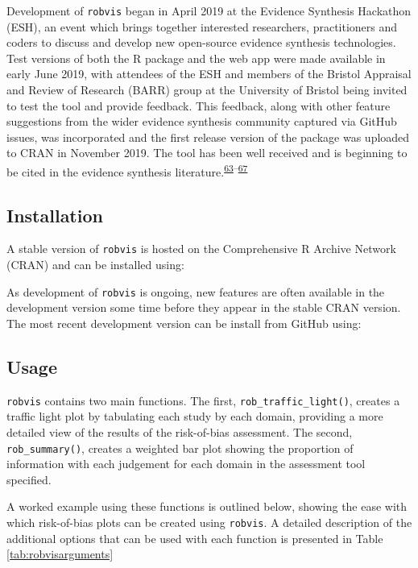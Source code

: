 \documentclass[a4paper, twoside]{templates/ociamthesis}
\begin{document}
Development of \texttt{robvis} began in April 2019 at the Evidence Synthesis Hackathon (ESH), an event which brings together interested researchers, practitioners and coders to discuss and develop new open-source evidence synthesis technologies. Test versions of both the R package and the web app were made available in early June 2019, with attendees of the ESH and members of the Bristol Appraisal and Review of Research (BARR) group at the University of Bristol being invited to test the tool and provide feedback. This feedback, along with other feature suggestions from the wider evidence synthesis community captured via GitHub issues, was incorporated and the first release version of the package was uploaded to CRAN in November 2019. The tool has been well received and is beginning to be cited in the evidence synthesis literature.\textsuperscript{\protect\hyperlink{ref-gibb2019consistent}{63}--\protect\hyperlink{ref-tanneru2020}{67}}

\hypertarget{installation-1}{%
\subsection{Installation}\label{installation-1}}

A stable version of \texttt{robvis} is hosted on the Comprehensive R Archive Network (CRAN) and can be installed using:

As development of \texttt{robvis} is ongoing, new features are often available in the development version some time before they appear in the stable CRAN version. The most recent development version can be install from GitHub using:

\hypertarget{usage}{%
\subsection{Usage}\label{usage}}

\texttt{robvis} contains two main functions. The first, \texttt{rob\_traffic\_light()}, creates a traffic light plot by tabulating each study by each domain, providing a more detailed view of the results of the risk-of-bias assessment. The second, \texttt{rob\_summary()}, creates a weighted bar plot showing the proportion of information with each judgement for each domain in the assessment tool specified.

A worked example using these functions is outlined below, showing the ease with which risk-of-bias plots can be created using \texttt{robvis}. A detailed description of the additional options that can be used with each function is presented in Table \ref{tab:robvisarguments}
\end{document}
